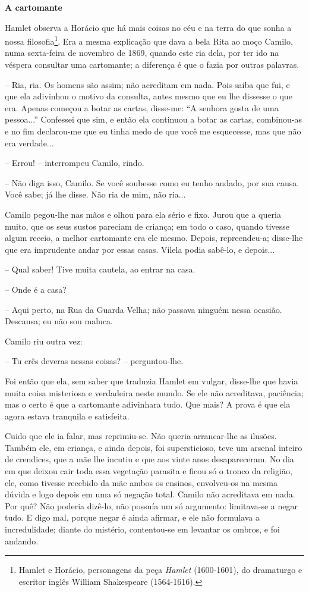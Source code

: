 \textbf{A cartomante}

Hamlet observa a Horácio que há mais coisas no céu e na terra do que
sonha a nossa filosofia\footnote{Hamlet e Horácio, personagens da peça
  \emph{Hamlet} (1600-1601), do dramaturgo e escritor inglês William
  Shakespeare (1564-1616).}. Era a mesma explicação que dava a bela Rita
ao moço Camilo, numa sexta-feira de novembro de 1869, quando este ria
dela, por ter ido na véspera consultar uma cartomante; a diferença é que
o fazia por outras palavras.

-- Ria, ria. Os homens são assim; não acreditam em nada. Pois saiba que
fui, e que ela adivinhou o motivo da consulta, antes mesmo que eu lhe
dissesse o que era. Apenas começou a botar as cartas, disse-me: ``A
senhora gosta de uma pessoa...'' Confessei que sim, e então ela
continuou a botar as cartas, combinou-as e no fim declarou-me que eu
tinha medo de que você me esquecesse, mas que não era verdade...

-- Errou! -- interrompeu Camilo, rindo.

-- Não diga isso, Camilo. Se você soubesse como eu tenho andado, por sua
causa. Você sabe; já lhe disse. Não ria de mim, não ria...

Camilo pegou-lhe nas mãos e olhou para ela sério e fixo. Jurou que a
queria muito, que os seus sustos pareciam de criança; em todo o caso,
quando tivesse algum receio, a melhor cartomante era ele mesmo. Depois,
repreendeu-a; disse-lhe que era imprudente andar por essas casas. Vilela
podia sabê-lo, e depois...

-- Qual saber! Tive muita cautela, ao entrar na casa.

-- Onde é a casa?

-- Aqui perto, na Rua da Guarda Velha; não passava ninguém nessa
ocasião. Descansa; eu não sou maluca.

Camilo riu outra vez:

-- Tu crês deveras nessas coisas? -- perguntou-lhe.

Foi então que ela, sem saber que traduzia Hamlet em vulgar, disse-lhe
que havia muita coisa misteriosa e verdadeira neste mundo. Se ele não
acreditava, paciência; mas o certo é que a cartomante adivinhara tudo.
Que mais? A prova é que ela agora estava tranquila e satisfeita.

Cuido que ele ia falar, mas reprimiu-se. Não queria arrancar-lhe as
ilusões. Também ele, em criança, e ainda depois, foi supersticioso, teve
um arsenal inteiro de crendices, que a mãe lhe incutiu e que aos vinte
anos desapareceram. No dia em que deixou cair toda essa vegetação
parasita e ficou só o tronco da religião, ele, como tivesse recebido da
mãe ambos os ensinos, envolveu-os na mesma dúvida e logo depois em uma
só negação total. Camilo não acreditava em nada. Por quê? Não poderia
dizê-lo, não possuía um só argumento: limitava-se a negar tudo. E digo
mal, porque negar é ainda afirmar, e ele não formulava a incredulidade;
diante do mistério, contentou-se em levantar os ombros, e foi andando.

